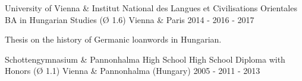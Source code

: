 \begin{cventries}
  \cventry
    {University of Vienna \& Institut National des Langues et Civilisations Orientales} %
    {BA in Hungarian Studies (Ø 1.6)} %
    {Vienna \& Paris} %
    {2014 - 2016 - 2017} %
    {
      \begin{cvitems} %
        \item{Thesis on the history of Germanic loanwords in Hungarian.}
      \end{cvitems}
    }
        
  \cventry
    {Schottengymnasium \& Pannonhalma High School} %
    {High School Diploma with Honors (Ø 1.1)} %
    {Vienna \& Pannonhalma (Hungary)} %
    {2005 - 2011 - 2013} %
    {}
\end{cventries}
